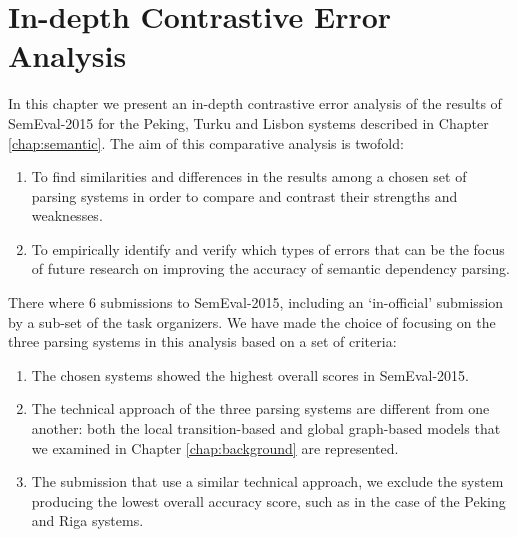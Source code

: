 \chapter{In-depth Contrastive Error Analysis}
\label{chap:analysis}




In this chapter we present an in-depth contrastive error analysis of the results of SemEval-2015 for the Peking, Turku and Lisbon systems described in Chapter \ref{chap:semantic}. The aim of this comparative analysis is twofold:

\begin{enumerate}
    \item To find similarities and differences in the results among a chosen set of parsing systems in order to compare and contrast their strengths and weaknesses.
    \item To empirically identify and verify which types of errors that can be the focus of future research on improving the accuracy of semantic dependency parsing.
\end{enumerate}

There where 6 submissions to SemEval-2015, including an `in-official' submission by a sub-set of the task organizers. We have made the choice of focusing on the three parsing systems in this analysis based on a set of criteria:

\begin{enumerate}
    \item The chosen systems showed the highest overall scores in SemEval-2015.
    \item The technical approach of the three parsing systems are different from one another: both the local transition-based and global graph-based models that we examined in Chapter \ref{chap:background} are represented.
    \item The submission that use a similar technical approach, we exclude the system producing the lowest overall accuracy score, such as in the case of the Peking and Riga systems.
\end{enumerate}


